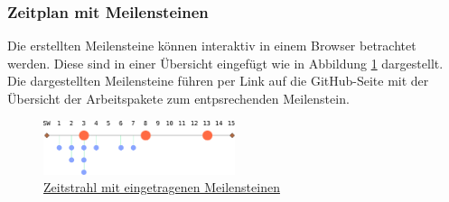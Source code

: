 \subsubsection{Zeitplan mit Meilensteinen}
Die erstellten Meilensteine können interaktiv in einem Browser betrachtet
werden. Diese sind in einer Übersicht eingefügt wie in Abbildung
\ref{fig:milestones} dargestellt. Die dargestellten Meilensteine führen per
Link auf die GitHub-Seite mit der Übersicht der Arbeitspakete zum
entpsrechenden Meilenstein.

\begin{figure}[h!]
	\centering
	\includegraphics[width=0.5\textwidth]{../../fig/github/milestones.pdf}
	\caption{\href{github.com/accefa/}{Zeitstrahl mit eingetragenen Meilensteinen}}
	\label{fig:milestones}
\end{figure}
